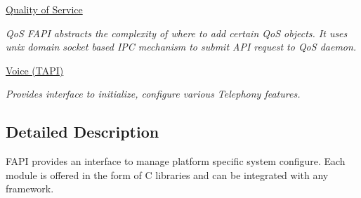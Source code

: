 \begin{DoxyCompactItemize}
\hyperlink{group__FAPI__QOS}{Quality of Service}
\begin{DoxyCompactList}\small\item\em Qo\-S F\-A\-P\-I abstracts the complexity of where to add certain Qo\-S objects. It uses unix domain socket based I\-P\-C mechanism to submit A\-P\-I request to Qo\-S daemon. \end{DoxyCompactList}\item 
\hyperlink{group__TAPI}{Voice (\-T\-A\-P\-I)}
\begin{DoxyCompactList}\small\item\em Provides interface to initialize, configure various Telephony features. \end{DoxyCompactList}\end{DoxyCompactItemize}


\subsection{Detailed Description}
F\-A\-P\-I provides an interface to manage platform specific system configure. Each module is offered in the form of C libraries and can be integrated with any framework. 